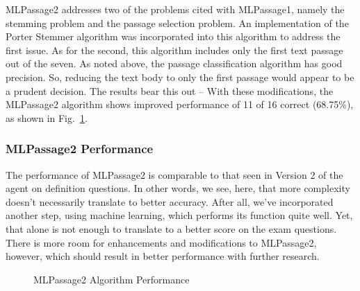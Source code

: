 MLPassage2 addresses two of the problems cited with MLPassage1, namely the stemming problem and the passage selection problem.  An implementation of the Porter Stemmer algorithm was incorporated into this algorithm to address the first issue.  As for the second, this algorithm includes only the first text passage out of the seven.  As noted above, the passage classification algorithm has good precision.  So, reducing the text body to only the first passage would appear to be a prudent decision.  The results bear this out -- With these modifications, the MLPassage2 algorithm shows improved performance of 11 of 16 correct (68.75\%), as shown in Fig.~\ref{fig:mlpassage2_performance}.  

\subsubsection{MLPassage2 Performance}

The performance of MLPassage2 is comparable to that seen in Version 2 of the agent on definition questions.  In other words, we see, here, that more complexity doesn't necessarily translate to better accuracy.   After all, we've incorporated another step, using machine learning, which performs its function quite well.  Yet, that alone is not enough to translate to a better score on the exam questions.  There is more room for enhancements and modifications to MLPassage2, however, which should result in better performance with further research.  

\begin{figure}
\centering
\vspace{1.0in}
\caption{MLPassage2 Algorithm Performance}
\label{fig:mlpassage2_performance}
\end{figure}





















